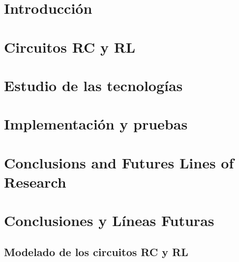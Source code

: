 \documentclass[12pt, a4paper, twoside]{article}
\begin{document}


\clearpage
\setcounter{page}{1}



\newpage



\newpage



\tableofcontents

\section{Introducción}


\section{Circuitos RC y RL}


\section{Estudio de las tecnologías}


\section{Implementación y pruebas}


\section{Conclusions and Futures Lines of Research}


\section{Conclusiones y Líneas Futuras}



\printbibliography

\newpage


\begin{umaappendices}
  \section{Modelado de los circuitos RC y RL}
  
\end{umaappendices}
\end{document}
